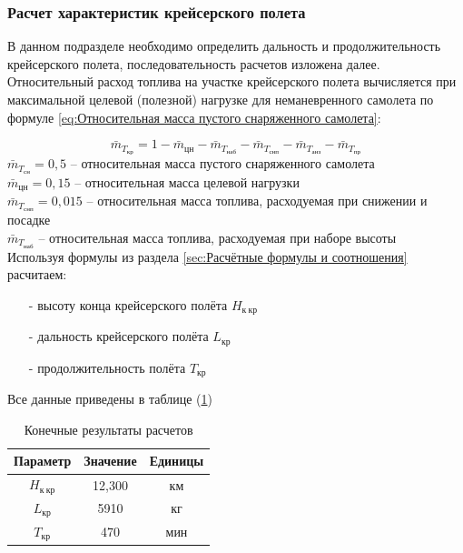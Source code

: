 \subsubsection{Расчет характеристик крейсерского полета}
\label{sec: Расчет характеристик крейсерского полета}

В данном подразделе необходимо определить дальность и
продолжительность крейсерского полета, последовательность расчетов
изложена далее.
Относительный расход топлива на участке крейсерского полета вычисляется
при максимальной целевой (полезной) нагрузке для неманевренного самолета
по формуле \ref{eq:Относительная масса пустого снаряженного самолета}: 

\begin{equation}
    \label{eq:Относительная масса пустого снаряженного самолета}
    \bar{m}_{T_\text{кр}} = 1 - \bar{m}_{\text{цн}} - \bar{m}_{T_\text{наб}} - \bar{m}_{T_\text{снп}} - \bar{m}_{T_\text{анз}} - \bar{m}_{T_\text{пр}}
\end{equation}
$\bar{m}_{T_\text{сн}} = 0,5$ -- относительная масса пустого снаряженного самолета \\ 
$\bar{m}_{\text{цн}} = 0,15$ -- относительная масса целевой нагрузки \\ 
$\bar{m}_{T_\text{снп}} = 0,015$ -- относительная масса топлива, расходуемая при снижении и
посадке \\ 
$\bar{m}_{T_\text{наб}}$ --  относительная масса топлива,
расходуемая при наборе высоты \\

Используя формулы из раздела \ref{sec:Расчётные формулы и соотношения} расчитаем: 

\begin{itemize}
    \item [-] высоту конца крейсерского полёта $H_{\text{к} \ \text{кр}}$
    \item [-] дальность крейсерского полёта $L_\text{кр}$
    \item [-] продолжительность полёта $T_\text{кр}$
\end{itemize}
Все данные приведены в таблице (\ref{tab:Крейсер})

\begin{table}[H]
    \centering
    \caption{Конечные результаты расчетов}
    \begin{tabular}{|c|c|c|}
    \hline
        Параметр & Значение &Единицы\\ \hline
        $H_{\text{к} \ \text{кр}}$ & 12,300 &км\\ \hline
        $L_\text{кр}$ & 5910 &кг\\ \hline
        $T_\text{кр}$ & 470 &мин\\ \hline
    \end{tabular}
    \label{tab:Крейсер}
\end{table}



